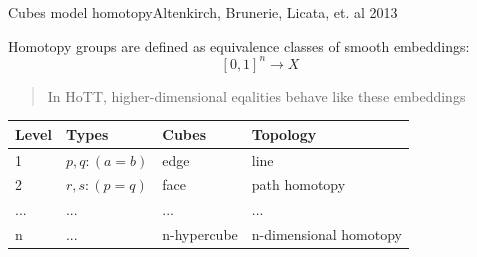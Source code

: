 \documentclass[english]{beamer}
\begin{document}
\begin{frame}{Cubes model homotopy}{Altenkirch, Brunerie, Licata, et. al 2013}
 
Homotopy groups are defined as equivalence classes of smooth embeddings:
$$[0,1]^n \rightarrow X$$

\begin{quotation}
In HoTT, higher-dimensional eqalities behave like these embeddings
\end{quotation}
\pause

    \begin{table}[]
        \begin{tabular}{@{}llll@{}}
        \toprule
        Level                & Types                & Cubes                 & Topology               \\ \midrule
        1                    & $p,q : (a = b)$        & edge                  & line                   \\
        2                    & $r,s : (p = q)$        & face                  & path homotopy          \\
        ... & ... & ... & ...   \\
        n                    & ... & n-hypercube           & n-dimensional homotopy \\ \bottomrule
        \end{tabular}
    \end{table}

%  
\end{frame}
\end{document}
